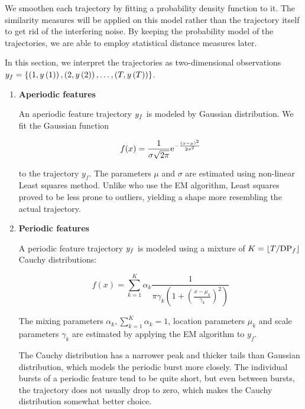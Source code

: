 We smoothen each trajectory by fitting a probability density function to it. The similarity measures will be applied on this model rather than the trajectory itself to get rid of the interfering noise. By keeping the probability model of the trajectories, we are able to employ statistical distance measures later.

In this section, we interpret the trajectories as two-dimensional observations $y_{f} = \{ \left( 1, y \left(1 \right) \right), \left( 2, y \left(2 \right) \right), \dots, \left( T, y \left(T \right) \right) \}$.

\begin{enumerate}

\item \textbf{Aperiodic features}

An aperiodic feature trajectory $y_{f}$ is modeled by Gaussian distribution. We fit the Gaussian function

\begin{equation*}
	f(x) = \frac{1}{\sigma \sqrt{2 \pi}} \mathrm{e}^{-\frac{\left( x - \mu \right)^{2}}{2 \sigma^{2}}}
\end{equation*}

to the trajectory $y_{f}$. The parameters $\mu$ and $\sigma$ are estimated using non-linear Least squares method. Unlike \cite{event-detection} who use the EM algorithm, Least squares proved to be less prone to outliers, yielding a shape more resembling the actual trajectory.

\item \textbf{Periodic features}

A periodic feature trajectory $y_{f}$ is modeled using a mixture of $K = \lfloor T / \text{DP}_{f}\rfloor$ Cauchy distributions:

\begin{equation*}
	f(x) = \sum_{k = 1}^{K}{\alpha_{k} \frac{1}{\pi \gamma_{k} \left( 1 + \left( \frac{x - \mu_{k}}{\gamma_{k}} \right)^2 \right)}}
\end{equation*}

The mixing parameters $\alpha_{k}, \sum_{k = 1}^{K}{\alpha_{k}} = 1$, location parameters $\mu_{k}$ and scale parameters $\gamma_{k}$ are estimated by applying the EM algorithm to $y_{f}$.

The Cauchy distribution has a narrower peak and thicker tails than Gaussian distribution, which models the periodic burst more closely. The individual bursts of a periodic feature tend to be quite short, but even between bursts, the trajectory does not usually drop to zero, which makes the Cauchy distribution somewhat better choice.

\end{enumerate}


